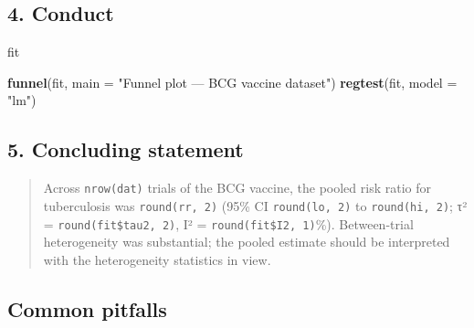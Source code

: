 \documentclass[
]{article}
\newenvironment{Shaded}{\begin{snugshade}}{\end{snugshade}}
\newcommand{\AttributeTok}[1]{\textcolor[rgb]{0.13,0.29,0.53}{#1}}
\newcommand{\DecValTok}[1]{\textcolor[rgb]{0.00,0.00,0.81}{#1}}
\newcommand{\FunctionTok}[1]{\textcolor[rgb]{0.13,0.29,0.53}{\textbf{#1}}}
\newcommand{\NormalTok}[1]{#1}
\newcommand{\OtherTok}[1]{\textcolor[rgb]{0.56,0.35,0.01}{#1}}
\newcommand{\SpecialCharTok}[1]{\textcolor[rgb]{0.81,0.36,0.00}{\textbf{#1}}}
\newcommand{\StringTok}[1]{\textcolor[rgb]{0.31,0.60,0.02}{#1}}
\begin{document}
\subsection{4. Conduct}\label{conduct}

\begin{Shaded}
\begin{Highlighting}[]
\NormalTok{fit}
\end{Highlighting}
\end{Shaded}

\begin{Shaded}
\begin{Highlighting}[]
\FunctionTok{funnel}\NormalTok{(fit, }\AttributeTok{main =} \StringTok{"Funnel plot — BCG vaccine dataset"}\NormalTok{)}
\FunctionTok{regtest}\NormalTok{(fit, }\AttributeTok{model =} \StringTok{"lm"}\NormalTok{)}
\end{Highlighting}
\end{Shaded}

\subsection{5. Concluding statement}\label{concluding-statement}

\begin{Shaded}
\end{Shaded}

\begin{quote}
Across \texttt{nrow(dat)} trials of the BCG vaccine, the pooled risk
ratio for tuberculosis was \texttt{round(rr,\ 2)} (95\% CI
\texttt{round(lo,\ 2)} to \texttt{round(hi,\ 2)}; τ² =
\texttt{round(fit\$tau2,\ 2)}, I² = \texttt{round(fit\$I2,\ 1)}\%).
Between-trial heterogeneity was substantial; the pooled estimate should
be interpreted with the heterogeneity statistics in view.
\end{quote}

\subsection{Common pitfalls}\label{common-pitfalls}
\end{document}
